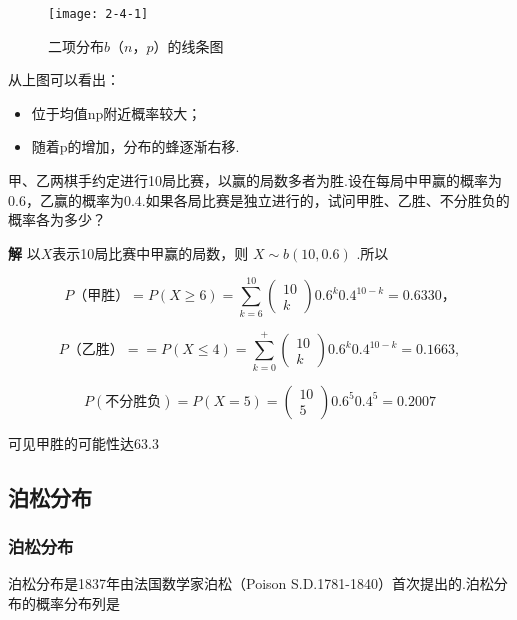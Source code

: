 \begin{figure}
	\centering
	\texttt{[image: 2-4-1]}
	\caption{二项分布$ b（n，p） $的线条图}
	\label{fig:2-4-1}
\end{figure}

从上图可以看出：
\begin{itemize}
	\item 位于均值np附近概率较大；
	\item 随着p的增加，分布的蜂逐渐右移.
\end{itemize}

\begin{example}
	甲、乙两棋手约定进行10局比赛，以赢的局数多者为胜.设在每局中甲赢的概率为0.6，乙赢的概率为0.4.如果各局比赛是独立进行的，试问甲胜、乙胜、不分胜负的概率各为多少？
	
	\textbf{解} 以$ X $表示10局比赛中甲赢的局数，则 $X \sim b(10,0.6)$ .所以
	
	\[
	P（\text{甲胜}）= P(X \geqslant 6)=\sum_{k=6}^{10} \left( 
	\begin{array}{l}{10} \\ 
	{k}
	\end{array}
	\right) 
	0.6^{k} 0.4^{10-k}=0.6330 ，
	\]
	
	\[
	P（\text{乙胜}）= =P(X \leqslant 4)=\sum_{k=0}^{+} \left( 
	\begin{array}{c}{10} \\ 
	{k}
	\end{array}
	\right) 
	0.6^{k} 0.4^{10-k}=0.1663 ,
	\]
	
	\[
	P(\text{不分胜负})=P(X=5)=\left( \begin{array}{c}{10} \\ {5}\end{array}\right) 0.6^{5} 0.4^{5}=0.2007
	\]
	
	可见甲胜的可能性达63.3%
\end{example}

\subsection{泊松分布}

\subsubsection{泊松分布}

泊松分布是1837年由法国数学家泊松（Poison S.D.1781-1840）首次提出的.泊松分布的概率分布列是


